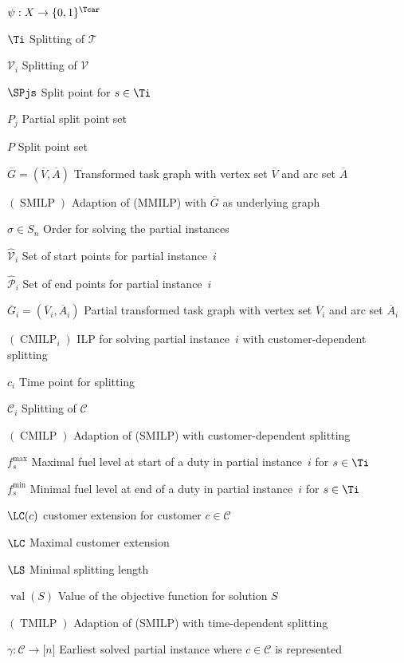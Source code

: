 \begin{labeling}{$\psi:X\to\{0,1\}^{\Tcar}$}
	\item[$\Ti$]{Splitting of $\mathcal{T}$}
	\item[$\mathcal{V}_i$]{Splitting of $\mathcal{V}$}
	\item[$\SPjs$]{Split point for $s\in\Ti$}
	\item[$P_j$]{Partial split point set}
	\item[$P$]{Split point set}
	\item[$\overline{G}=\left(\overline{V},\overline{A}\right)$]{Transformed task graph with vertex set $\overline{V}$ and arc set $\overline{A}$}
	\item[$(\operatorname{SMILP})$]{Adaption of (MMILP) with $\overline{G}$ as underlying graph}
	\item[$\sigma\in S_n$]{Order for solving the partial instances}
	\item[$\hat{\mathcal{V}}_i$]{Set of start points for partial instance~$i$}
	\item[$\hat{\mathcal{P}}_i$]{Set of end points for partial instance~$i$}
	\item[$\overline{G}_i=\left(\overline{V}_i,\overline{A}_i\right)$]{Partial transformed task graph with vertex set $\overline{V}_i$ and arc set $\overline{A}_i$}
	\item[$(\operatorname{CMILP}_i)$]{ILP for solving partial instance~$i$ with customer-dependent splitting}
	\item[$c_i$]{Time point for splitting}
	\item[$\mathcal{C}_i$]{Splitting of $\mathcal{C}$}
	\item[$(\operatorname{CMILP})$]{Adaption of (SMILP) with customer-dependent splitting}
	\item[$f^{\max}_s$]{Maximal fuel level at start of a duty in partial instance~$i$ for $s\in\Ti$}
	\item[$f^{\min}_s$]{Minimal fuel level at end of a duty in partial instance~$i$ for $s\in\Ti$}
	\item[$\LC(c)$]{customer extension for customer $c\in\mathcal{C}$}
	\item[$\LC$]{Maximal customer extension}
	\item[$\LS$]{Minimal splitting length}
	\item[$\operatorname{val}(S)$]{Value of the objective function for solution $S$}
	\item[$(\operatorname{TMILP})$]{Adaption of (SMILP) with time-dependent splitting}
	\item[$\gamma:\mathcal{C}\to\lbrack n\rbrack$]{Earliest solved partial instance where $c\in\mathcal{C}$ is represented}

\end{labeling}
